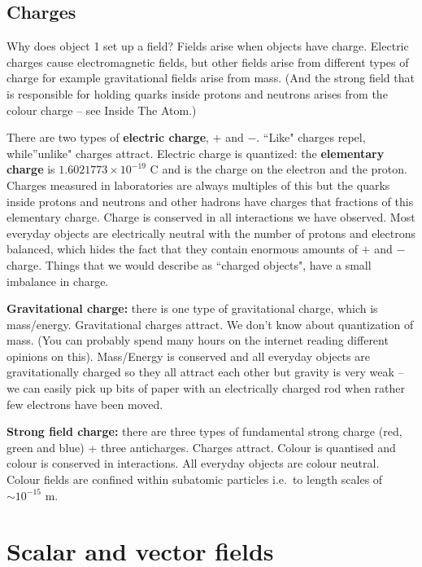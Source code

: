 \documentclass[
]{book}
\theoremstyle{definition}
\theoremstyle{definition}
\theoremstyle{definition}
\theoremstyle{definition}
\theoremstyle{remark}
\begin{document}
\hypertarget{charges}{%
\subsection{Charges}\label{charges}}

Why does object 1 set up a field? Fields arise when objects have charge.
Electric charges cause electromagnetic fields, but other fields arise
from different types of charge for example gravitational fields arise
from mass. (And the strong field that is responsible for holding quarks
inside protons and neutrons arises from the colour charge -- see Inside
The Atom.)

There are two types of \textbf{electric charge}, \(+\) and \(-\). ``Like" charges
repel, while''unlike" charges attract. Electric charge is quantized:
the \textbf{elementary charge} is \(1.6021773 \times 10^{-19}\) C and is the
charge on the electron and the proton. Charges measured in laboratories
are always multiples of this but the quarks inside protons and neutrons
and other hadrons have charges that fractions of this elementary charge.
Charge is conserved in all interactions we have observed. Most everyday
objects are electrically neutral with the number of protons and
electrons balanced, which hides the fact that they contain enormous
amounts of \(+\) and \(-\) charge. Things that we would describe as ``charged
objects", have a small imbalance in charge.

\textbf{Gravitational charge:} there is one type of gravitational charge,
which is mass/energy. Gravitational charges attract. We don't know about
quantization of mass. (You can probably spend many hours on the internet
reading different opinions on this). Mass/Energy is conserved and all
everyday objects are gravitationally charged so they all attract each
other but gravity is very weak -- we can easily pick up bits of paper
with an electrically charged rod when rather few electrons have been
moved.

\textbf{Strong field charge:} there are three types of fundamental strong
charge (red, green and blue) + three anticharges. Charges attract.
Colour is quantised and colour is conserved in interactions. All
everyday objects are colour neutral. Colour fields are confined within
subatomic particles i.e.~to length scales of \(\sim 10^{-15}\) m.

\hypertarget{scalar-and-vector-fields}{%
\section{Scalar and vector fields}\label{scalar-and-vector-fields}}
\end{document}
